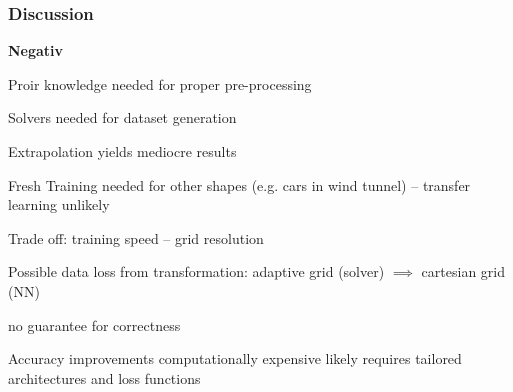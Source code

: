 \begin{frame}
    \frametitle{Discussion}
	\vspace*{0.8cm}
    \textbf{Negativ}

\begin{PraesentationAufzaehlung}
\item Proir knowledge needed for proper pre-processing

\item Solvers needed for dataset generation

\item Extrapolation yields mediocre results

\item Fresh Training needed for other shapes (e.g. cars in wind tunnel) \newline -- transfer learning unlikely

\item Trade off: training speed -- grid resolution

\item Possible data loss from transformation: \newline adaptive grid (solver) $\implies$ cartesian grid (NN)

\item no guarantee for correctness

\item Accuracy improvements computationally expensive likely requires \newline tailored architectures and loss functions
\end{PraesentationAufzaehlung}
\end{frame}
\clearpage
